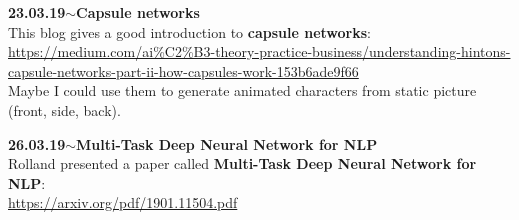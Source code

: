 \documentclass[11pt,a4paper]{article}
\newenvironment{loggentry}[2]%
{\noindent\textbf{#1}\hspace{1cm}$\mathbf{\sim}$\text{ }\textbf{#2}\\}{\vspace{0.5cm}}
\begin{document}
\begin{loggentry}{23.03.19}{Capsule networks}

This blog gives a good introduction to \textbf{capsule networks}:\\
\url{https://medium.com/ai%C2%B3-theory-practice-business/understanding-hintons-capsule-networks-part-ii-how-capsules-work-153b6ade9f66}\\
Maybe I could use them to generate animated characters from static picture (front, side, back).

\end{loggentry}


\begin{loggentry}{26.03.19}{Multi-Task Deep Neural Network for NLP}

Rolland presented a paper called \textbf{Multi-Task Deep Neural Network for NLP}:\\
\url{https://arxiv.org/pdf/1901.11504.pdf}\\

\end{loggentry}
\end{document}
